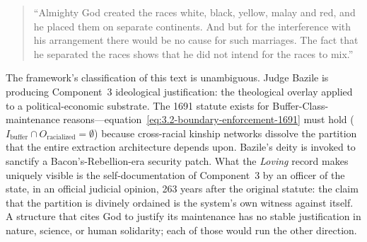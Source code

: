 \begin{quotation}
``Almighty God created the races white, black, yellow, malay and red, and he placed them on separate continents. And but for the interference with his arrangement there would be no cause for such marriages. The fact that he separated the races shows that he did not intend for the races to mix.''
\end{quotation}

The framework's classification of this text is unambiguous. Judge Bazile is producing Component~3 ideological justification: the theological overlay applied to a political-economic substrate. The 1691 statute exists for Buffer-Class-maintenance reasons---equation~\ref{eq:3.2-boundary-enforcement-1691} must hold ($I_{\text{buffer}} \cap O_{\text{racialized}} = \emptyset$) because cross-racial kinship networks dissolve the partition that the entire extraction architecture depends upon. Bazile's deity is invoked to sanctify a Bacon's-Rebellion-era security patch. What the \textit{Loving} record makes uniquely visible is the self-documentation of Component~3 by an officer of the state, in an official judicial opinion, 263 years after the original statute: the claim that the partition is divinely ordained is the system's own witness against itself. A structure that cites God to justify its maintenance has no stable justification in nature, science, or human solidarity; each of those would run the other direction.

